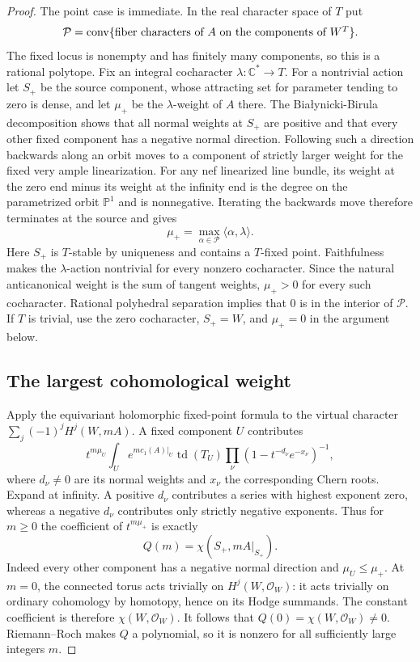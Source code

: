 \begin{proof}
The point case is immediate.  In the real character space of $T$ put
\[
 \mathcal P=\operatorname{conv}
 \{\hbox{fiber characters of $A$ on the components of $W^T$}\}.
\]
The fixed locus is nonempty and has finitely many components, so this
is a rational polytope.  Fix an integral cocharacter
$\lambda:\mathbb C^*\to T$.  For a nontrivial action let $S_+$ be the
source component, whose attracting set for parameter tending to zero
is dense, and let $\mu_+$ be the $\lambda$-weight of $A$ there.
The Bia\l ynicki-Birula decomposition \cite{BB1973} shows that all
normal weights at $S_+$ are positive and that every other fixed
component has a negative normal direction.  Following such a direction
backwards along an orbit moves to a component of strictly larger
weight for the fixed very ample linearization.  For any nef
linearized line bundle, its weight at the zero end minus its weight
at the infinity end is the degree on the parametrized orbit
$\mathbb P^1$ and is nonnegative.  Iterating the backwards move
therefore terminates at the source and gives
\begin{equation}\label{V:source-support}
 \mu_+=\max_{\alpha\in\mathcal P}\langle\alpha,\lambda\rangle.
\end{equation}
Here $S_+$ is $T$-stable by uniqueness and contains a $T$-fixed point.
Faithfulness makes the $\lambda$-action nontrivial for every nonzero
cocharacter.  Since the natural anticanonical weight is the sum of
tangent weights, $\mu_+>0$ for every such cocharacter.  Rational
polyhedral separation implies that $0$ is in the interior of
$\mathcal P$.  If $T$ is trivial, use the zero cocharacter, $S_+=W$,
and $\mu_+=0$ in the argument below.

\subsection*{The largest cohomological weight}

Apply the equivariant holomorphic fixed-point formula
\cite{AtiyahSegal1968,AtiyahSinger1968} to the virtual character
$\sum_j(-1)^j H^j(W,mA)$.  A fixed component $U$ contributes
\[
 t^{m\mu_U}\int_U e^{m c_1(A)|_U}\operatorname{td}(T_U)
       \prod_\nu(1-t^{-d_\nu}e^{-x_\nu})^{-1},
\]
where $d_\nu\ne0$ are its normal weights and $x_\nu$ the corresponding
Chern roots.  Expand at infinity.  A positive $d_\nu$ contributes a
series with highest exponent zero, whereas a negative $d_\nu$
contributes only strictly negative exponents.  Thus for $m\ge0$ the
coefficient of $t^{m\mu_+}$ is exactly
\[
 Q(m)=\chi(S_+,mA|_{S_+}).
\]
Indeed every other component has a negative normal direction and
$\mu_U\le\mu_+$.  At $m=0$, the connected torus acts trivially on
$H^j(W,\mathcal O_W)$: it acts trivially on ordinary cohomology by
homotopy, hence on its Hodge summands.  The constant coefficient is
therefore $\chi(W,\mathcal O_W)$.  It follows that
$Q(0)=\chi(W,\mathcal O_W)\ne0$.
Riemann--Roch makes $Q$ a polynomial, so it is nonzero for all
sufficiently large integers $m$.


\end{proof}
